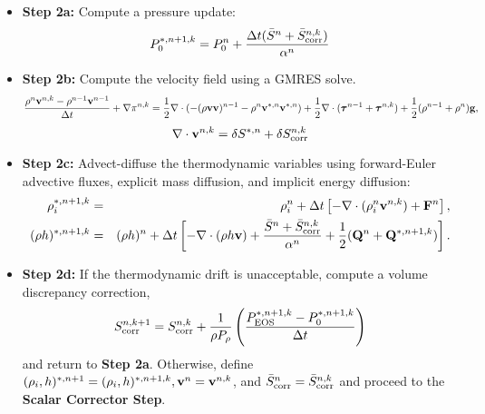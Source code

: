 \documentclass[final]{siamltex}
\def\Fb {{\bf F}}
\def\gb {{\bf g}}
\def\Qb {{\bf Q}}
\def\vb {{\bf v}}
\def\taub   {\boldsymbol{\tau}}
\def\half   {\frac{1}{2}}
\begin{document}
\begin{itemize}
\item {\bf Step 2a:} Compute a pressure update:
\begin{equation}
P_0^{*,n+1,k} = P_0^n + \frac{\Delta t(\bar{S}^n + \bar{S}_{\rm corr}^{n,k})}{\alpha^n}
\end{equation}
\item {\bf Step 2b:} Compute the velocity field using a GMRES solve.
\begin{equation}
\frac{\rho^n\vb^{n,k} - \rho^{n-1}\vb^{n-1}}{\Delta t} + \nabla\pi^{n,k} = \half\nabla\cdot(-(\rho\vb\vb)^{n-1} - \rho^n\vb^{*,n}\vb^{*,n}) + \frac{1}{2}\nabla\cdot(\taub^{n-1} + \taub^{n,k}) + \frac{1}{2}(\rho^{n-1} + \rho^n)\gb,
\end{equation}
\begin{equation}
\nabla\cdot\vb^{n,k} = \delta S^{*,n} + \delta S_{\rm corr}^{n,k}
\end{equation}
\item {\bf Step 2c:} Advect-diffuse the thermodynamic variables using forward-Euler advective fluxes,
explicit mass diffusion, and implicit energy diffusion:
\begin{eqnarray}
\rho_i^{*,n+1,k} &=& \rho_i^n + \Delta t\left[-\nabla\cdot(\rho_i^n\vb^{n,k}) + \Fb^n\right], \\
(\rho h)^{*,n+1,k} &=& (\rho h)^n + \Delta t\left[-\nabla\cdot(\rho h\vb) + \frac{\bar{S}^n + \bar{S}_{\rm corr}^{n,k}}{\alpha^n} + \frac{1}{2}(\Qb^n + \Qb^{*,n+1,k})\right].\nonumber\\
\end{eqnarray}
\item {\bf Step 2d:} If the thermodynamic drift is unacceptable, compute a volume 
discrepancy correction,
\begin{equation}
S_{\rm corr}^{n,k+1} = S_{\rm corr}^{n,k} + \frac{1}{\rho P_\rho}\left(\frac{P_{\rm EOS}^{*,n+1,k} - P_0^{*,n+1,k}}{\Delta t}\right)
\end{equation}
and return to {\bf Step 2a}.  Otherwise, define 
$(\rho_i,h)^{*,n+1} = (\rho_i,h)^{*,n+1,k}, \vb^n = \vb^{n,k}$, and $\bar{S}_{\rm corr}^{n} = \bar{S}_{\rm corr}^{n,k}$ and proceed to 
the {\bf Scalar Corrector Step}.\\
\end{itemize}
\end{document}
